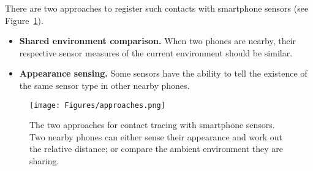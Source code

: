\documentclass[graybox]{svmult}
\begin{document}
There are two approaches to register such contacts with smartphone sensors (see Figure~\ref{approaches}).
\begin{itemize}
    \item \textbf{Shared environment comparison.} When two phones are nearby, their respective sensor measures of the current environment should be similar.
    
    \item \textbf{Appearance sensing.} Some sensors have the ability to tell the existence of the same sensor type in other nearby phones.
\end{itemize}
\begin{figure}[h]
    \centering
    \sidecaption
    \texttt{[image: Figures/approaches.png]}
    \caption{The two approaches for contact tracing with smartphone sensors. Two nearby phones can either sense their appearance and work out the relative distance; or compare the ambient environment they are sharing.}
    \label{approaches}       
\end{figure}
\end{document}
